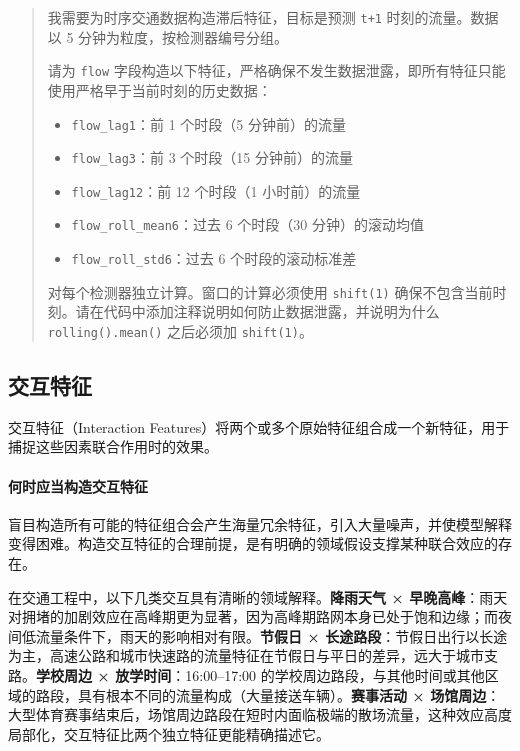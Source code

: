 \begin{quote}
我需要为时序交通数据构造滞后特征，目标是预测 \texttt{t+1} 时刻的流量。数据以 5 分钟为粒度，按检测器编号分组。

请为 \texttt{flow} 字段构造以下特征，严格确保不发生数据泄露，即所有特征只能使用严格早于当前时刻的历史数据：
\begin{itemize}
  \item \texttt{flow\_lag1}：前 1 个时段（5 分钟前）的流量
  \item \texttt{flow\_lag3}：前 3 个时段（15 分钟前）的流量
  \item \texttt{flow\_lag12}：前 12 个时段（1 小时前）的流量
  \item \texttt{flow\_roll\_mean6}：过去 6 个时段（30 分钟）的滚动均值
  \item \texttt{flow\_roll\_std6}：过去 6 个时段的滚动标准差
\end{itemize}

对每个检测器独立计算。窗口的计算必须使用 \texttt{shift(1)} 确保不包含当前时刻。请在代码中添加注释说明如何防止数据泄露，并说明为什么 \texttt{rolling().mean()} 之后必须加 \texttt{shift(1)}。
\end{quote}

\subsection{交互特征}

交互特征（Interaction Features）将两个或多个原始特征组合成一个新特征，用于捕捉这些因素联合作用时的效果。

\paragraph{何时应当构造交互特征}

盲目构造所有可能的特征组合会产生海量冗余特征，引入大量噪声，并使模型解释变得困难。构造交互特征的合理前提，是有明确的领域假设支撑某种联合效应的存在。

在交通工程中，以下几类交互具有清晰的领域解释。\textbf{降雨天气 × 早晚高峰}：雨天对拥堵的加剧效应在高峰期更为显著，因为高峰期路网本身已处于饱和边缘；而夜间低流量条件下，雨天的影响相对有限。\textbf{节假日 × 长途路段}：节假日出行以长途为主，高速公路和城市快速路的流量特征在节假日与平日的差异，远大于城市支路。\textbf{学校周边 × 放学时间}：16:00--17:00 的学校周边路段，与其他时间或其他区域的路段，具有根本不同的流量构成（大量接送车辆）。\textbf{赛事活动 × 场馆周边}：大型体育赛事结束后，场馆周边路段在短时内面临极端的散场流量，这种效应高度局部化，交互特征比两个独立特征更能精确描述它。

